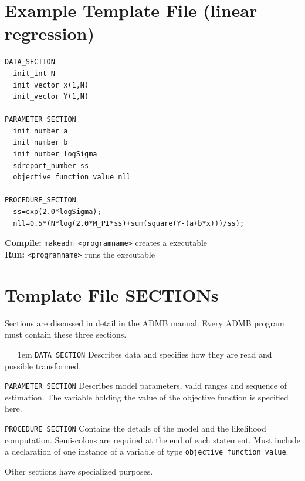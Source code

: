 \section{Example Template File (linear regression)}
\begin{verbatim}
DATA_SECTION
  init_int N
  init_vector x(1,N)
  init_vector Y(1,N)

PARAMETER_SECTION
  init_number a
  init_number b
  init_number logSigma
  sdreport_number ss
  objective_function_value nll

PROCEDURE_SECTION
  ss=exp(2.0*logSigma);
  nll=0.5*(N*log(2.0*M_PI*ss)+sum(square(Y-(a+b*x)))/ss);
\end{verbatim}
{\bf Compile:} \verb|makeadm <programname>| creates a executable \\
{\bf Run:} \verb|<programname>| runs the executable

\section{Template File SECTIONs}
Sections are discussed in detail in the ADMB manual.
Every ADMB program must contain these three sections.

\par{\everypar={\hangindent=1em }
\verb+DATA_SECTION+ Describes data and specifies how they are read 
and possible transformed.

\verb+PARAMETER_SECTION+ Describes model parameters, valid ranges and
sequence of estimation. The variable holding the value of the
objective function is specified here.

\verb+PROCEDURE_SECTION+ Contains the details of the model and the
likelihood computation.  Semi-colons are required at the end of each statement.
Must include a declaration of one instance of a variable of type
\verb|objective_function_value|.

\par}

Other sections have specialized purposes.

